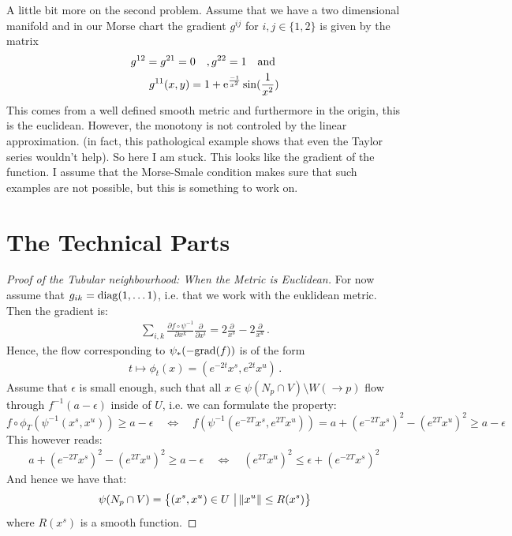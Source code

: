 A little bit more on the second problem. Assume that we have a two dimensional manifold and in our Morse chart the gradient $g^{ij}$ for $i,j\in \{1,2\}$ is given by the matrix
\begin{align*}
g^{12}=g^{21}=0 \quad, g^{22}=1\quad \text{and }\\
g^{11}(x,y)=1+\mathrm{e}^{\frac{-1}{x^2}} \sin (\frac{1}{x^2})
\end{align*} This comes from a well defined smooth metric and furthermore in the origin, this is the euclidean. However, the monotony is not controled by the linear approximation. (in fact, this pathological example shows that even the Taylor series wouldn't help).
So here I am stuck. This looks like the gradient of the function. I assume that the Morse-Smale condition makes sure that such examples are not possible, but this is something to work on. 
\section{The Technical Parts}
\begin{proof}[Proof of the Tubular neighbourhood: When the Metric is Euclidean]\label{proof: When the Metric is Euclidean}
For now assume that $g_{ik}=\mathrm{diag}(1,\dots 1)$, i.e. that we work with the euklidean metric. Then the gradient is:
\begin{align*}
	\sum_{i,k} \frac{\partial f \circ \psi^{-1}}{\partial x^k} \frac{\partial}{\partial x^i}= 2\frac{\partial}{x^s} -2\frac{\partial}{x^u}\, .
\end{align*} Hence, the flow corresponding to $\psi_*(-\mathrm{grad}(f))$ is of the form
\begin{align*}
	t\mapsto \phi_t(x)=(e^{-2t}x^s,e^{2t}x^u) \, .
\end{align*} Assume that $\epsilon$ is small enough, such that all $x\in \psi(N_p\cap V)\setminus W(\to p)$ flow through $f^{-1}(a-\epsilon)$ inside of $U$, i.e. we can formulate the property:
\begin{equation}
	f\circ \phi_T(\psi^{-1}(x^s,x^ u))\geq a-\epsilon \quad \Leftrightarrow \quad f\left( \psi^{-1}(e^{-2T}x^s,e^{2T}x^u) \right)= a+{( e^{-2T}x^s)}^2-(e^{2T}x^u)^2  \geq a-\epsilon
\end{equation}
This however reads: 
\begin{align} \label{eq: splitting and monotonie}
	a+{( e^{-2T}x^s)}^2-(e^{2T}x^u)^2  \geq a-\epsilon  \quad \Leftrightarrow \quad (e^{2T}x^u)^2 \leq \epsilon+ {( e^{-2T}x^s)}^2 \, 
\end{align}And hence we have that:
\begin{equation*}
	\psi(N_p\cap V)=\left\{(x^s,x^u)\in U ~\middle|~\norm{x^u}\leq R(x^s)\right\}
\end{equation*} where $R(x^s)$ is a smooth function.
\end{proof}


